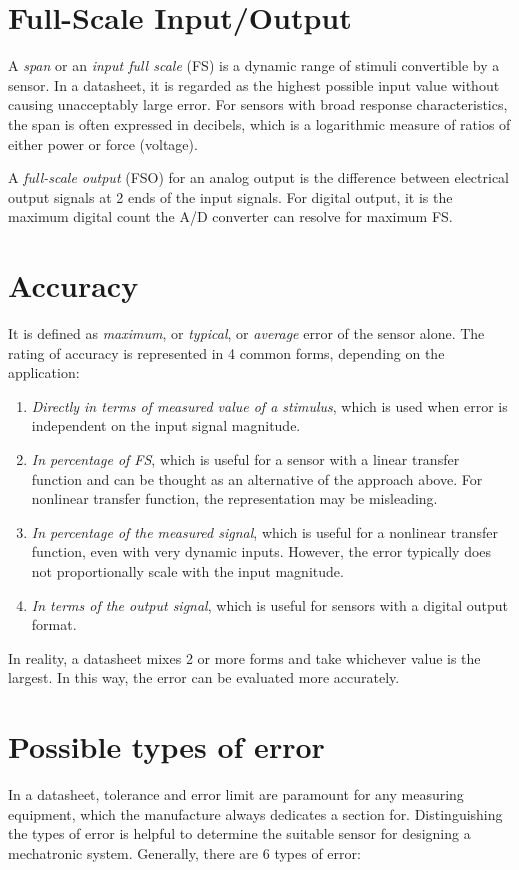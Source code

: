 \section{Full-Scale Input/Output}
A \textit{span} or an \textit{input full scale} (FS) is a dynamic range of stimuli convertible by a sensor. In a datasheet, it is regarded as the highest possible input value without causing unacceptably large error. For sensors with broad response characteristics, the span is often expressed in decibels, which is a logarithmic measure of ratios of either power or force (voltage).

A \textit{full-scale output} (FSO) for an analog output is the difference between electrical output signals at 2 ends of the input signals. For digital output, it is the maximum digital count the A/D converter can resolve for maximum FS.

\section{Accuracy}
It is defined as \textit{maximum}, or \textit{typical}, or \textit{average} error of the sensor alone. The rating of accuracy is represented in 4 common forms, depending on the application:
\begin{enumerate}
	\item \textit{Directly in terms of measured value of a stimulus}, which is used when error is independent on the input signal magnitude.
	\item \textit{In percentage of FS}, which is useful for a sensor with a linear transfer function and can be thought as an alternative of the approach above. For nonlinear transfer function, the representation may be misleading.
	\item \textit{In percentage of the measured signal}, which is useful for a nonlinear transfer function, even with very dynamic inputs. However, the error typically does not proportionally scale with the input magnitude.
	\item \textit{In terms of the output signal}, which is useful for sensors with a digital output format.
\end{enumerate}
In reality, a datasheet mixes 2 or more forms and take whichever value is the largest. In this way, the error can be evaluated more accurately.

\section{Possible types of error}
In a datasheet, tolerance and error limit are paramount for any measuring equipment, which the manufacture always dedicates a section for. Distinguishing the types of error is helpful to determine the suitable sensor for designing a mechatronic system. Generally, there are 6 types of error:
